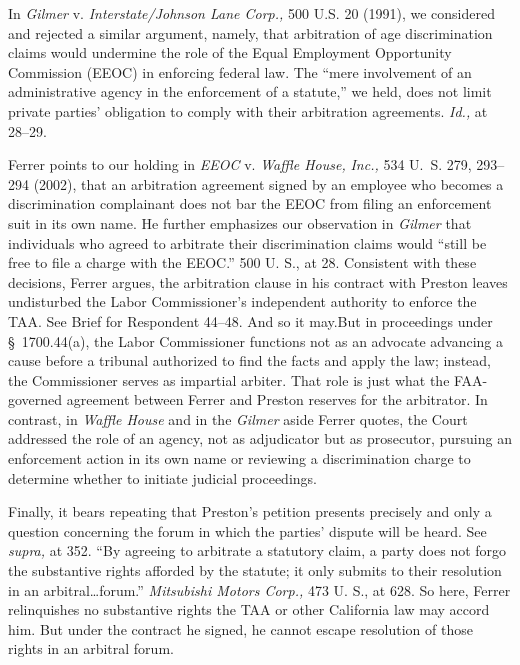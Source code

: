   In \emph{Gilmer} v. \emph{Interstate/Johnson Lane Corp.,} 500 U.S. 20
(1991), we considered and rejected a similar argument, namely, that
arbitration of age discrimination claims would undermine the role of the
Equal Employment Opportunity Commission (EEOC) in enforcing federal law.
The ``mere involvement of an administrative agency in the enforcement
of a statute,'' we held, does not limit private parties' obligation
to comply with their arbitration agreements. \emph{Id.,} at 28--29.

  Ferrer points to our holding in \emph{EEOC} v. \emph{Waffle House,}
\emph{Inc.,} 534 U.~S. 279, 293--294 (2002), that an arbitration
agreement signed by an employee who becomes a discrimination complainant
does not bar the EEOC from filing an enforcement suit in its own name.
He further emphasizes our observation in \emph{Gilmer} that individuals who
agreed to arbitrate their discrimination claims would ``still be free
to file a charge with the EEOC.'' 500 U. S., at 28. Consistent with
these decisions, Ferrer argues, the arbitration clause in his contract
with Preston leaves undisturbed the Labor Com\newpage missioner's
independent authority to enforce the TAA. See Brief for Respondent
44--48. And so it may.\footnotemark[7] But in proceedings under \S~1700.44(a),
the Labor Commissioner functions not as an advocate advancing a cause
before a tribunal authorized to find the facts and apply the law;
instead, the Commissioner serves as impartial arbiter. That role is just
what the FAA-governed agreement between Ferrer and Preston reserves for
the arbitrator. In contrast, in \emph{Waffle House} and in the \emph{Gilmer}
aside Ferrer quotes, the Court addressed the role of an agency, not as
adjudicator but as prosecutor, pursuing an enforcement action in its
own name or reviewing a discrimination charge to determine whether to
initiate judicial proceedings.

  Finally, it bears repeating that Preston's petition presents
precisely and only a question concerning the forum in which the
parties' dispute will be heard. See \emph{supra,} at 352. ``By
agreeing to arbitrate a statutory claim, a party does not forgo
the substantive rights afforded by the statute; it only submits to
their resolution in an arbitral\dots forum.'' \emph{Mitsubishi
Motors Corp.,} 473 U. S., at 628. So here, Ferrer relinquishes no
substantive rights the TAA or other California law may accord him. But
under the contract he signed, he cannot escape resolution of those
rights in an arbitral forum.


